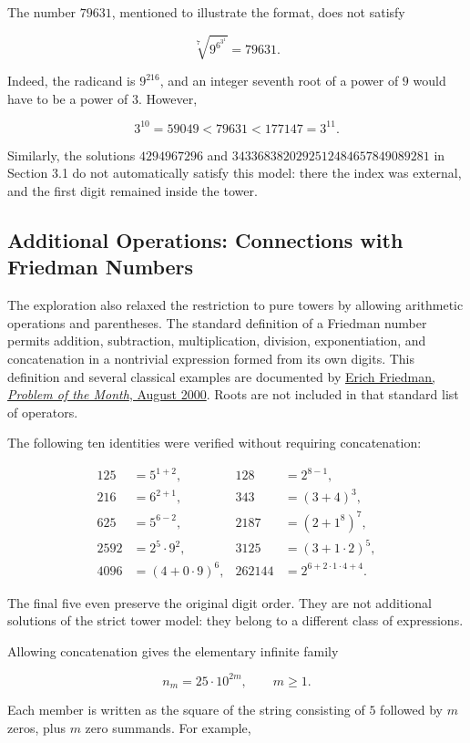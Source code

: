\documentclass[11pt,a4paper]{article}
\begin{document}
The number $79631$, mentioned to illustrate the format, does not satisfy

\[
\sqrt[7]{9^{6^{3^1}}}=79631.
\]

Indeed, the radicand is $9^{216}$, and an integer seventh root of a power of $9$ would have to be a power of $3$. However,

\[
3^{10}=59049<79631<177147=3^{11}.
\]

Similarly, the solutions $4294967296$ and $3433683820292512484657849089281$ in Section 3.1 do not automatically satisfy this model: there the index was external, and the first digit remained inside the tower.

\subsection{Additional Operations: Connections with Friedman Numbers}

The exploration also relaxed the restriction to pure towers by allowing arithmetic operations and parentheses. The standard definition of a Friedman number permits addition, subtraction, multiplication, division, exponentiation, and concatenation in a nontrivial expression formed from its own digits. This definition and several classical examples are documented by \href{https://erich-friedman.github.io/mathmagic/0800.html}{Erich Friedman, \emph{Problem of the Month}, August 2000}. Roots are not included in that standard list of operators.

The following ten identities were verified without requiring concatenation:

\[
\begin{aligned}
125&=5^{1+2},&128&=2^{8-1},\\
216&=6^{2+1},&343&=(3+4)^3,\\
625&=5^{6-2},&2187&=(2+1^8)^7,\\
2592&=2^5\cdot9^2,&3125&=(3+1\cdot2)^5,\\
4096&=(4+0\cdot9)^6,&262144&=2^{6+2\cdot1\cdot4+4}.
\end{aligned}
\]

The final five even preserve the original digit order. They are not additional solutions of the strict tower model: they belong to a different class of expressions.

Allowing concatenation gives the elementary infinite family

\[
n_m=25\cdot10^{2m},\qquad m\geq1.
\]

Each member is written as the square of the string consisting of $5$ followed by $m$ zeros, plus $m$ zero summands. For example,
\end{document}
